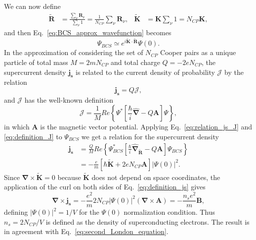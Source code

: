\documentclass[../main/main.tex]{subfiles}
\begin{document}
We can now define
\begin{align}  \label{eq:tildaR_tildaK}
\boldsymbol{\tilde{R}} &= \frac{\sum_{\nu} \boldsymbol{R}_{\nu}}{\sum_{\nu} 1} = \frac{1}{N_{CP}}\sum_{\nu} \boldsymbol{R}_{\nu}, & \boldsymbol{\tilde{K}} &= \boldsymbol{K} \sum_{\nu} 1 = N_{CP} \boldsymbol{K},
\end{align}
and then Eq.~\eqref{eq:BCS_approx_wavefunction} becomes
\begin{equation} \label{eq:BCS_approx2_wavefunction}
    \Psi_{BCS} \simeq e^{i \boldsymbol{\tilde{K}} \cdot \boldsymbol{\tilde{R}}} \Psi(0).
\end{equation}
In the approximation of considering the set of $N_{CP}$ Cooper pairs as a unique particle of total mass $M=2m N_{CP}$ and total charge $Q=-2e N_{CP}$, the supercurrent density $\boldsymbol{j_s}$ is related to the current density of probability $\boldsymbol{\mathcal{J}}$ by the relation
\begin{equation} \label{eq:relation_js_J}
    \boldsymbol{j_s} = Q \boldsymbol{\mathcal{J}},
\end{equation}
and $\boldsymbol{\mathcal{J}}$ has the well-known definition \cite[p.~314]{ballentine1998quantum}
\begin{equation} \label{eq:definition_J}
    \boldsymbol{\mathcal{J}} = \frac{1}{M} Re\left\{ \Psi^{*} \left[ \frac{\hbar}{i}\hat{\boldsymbol{\nabla}} - Q \boldsymbol{A} \right] \Psi \right\},
\end{equation}
in which $\boldsymbol{A}$ is the magnetic vector potential. Applying Eq.~\eqref{eq:relation_js_J} and \eqref{eq:definition_J} to $\Psi_{BCS}$ we get a relation for the supercurrent density
\begin{equation} \label{eq:definition_js}
\begin{split}
    \boldsymbol{j_s} & = \frac{Q}{M} Re\left\{ \Psi_{BCS}^{*} \left[ \frac{\hbar}{i} \hat{\boldsymbol{\nabla}}_{\boldsymbol{\tilde{R}}} - Q \boldsymbol{A} \right] \Psi_{BCS} \right\}\\
    & = -\frac{e}{m} \left[ \hbar \boldsymbol{\tilde{K}} + 2e N_{CP} \boldsymbol{A} \right] |\Psi(0)|^2 .
\end{split}
\end{equation}
Since $\boldsymbol{\nabla} \times \boldsymbol{\tilde{K}} = 0$ because $\boldsymbol{\tilde{K}}$ does not depend on space coordinates, the application of the curl on both sides of Eq.~\eqref{eq:definition_js} gives
\begin{equation} \label{eq:demonstration_second_London_equation}
    \boldsymbol{\nabla}  \times \boldsymbol{j_s} = - \frac{e^2}{m} 2N_{CP}|\Psi(0)|^2 \left( \boldsymbol{\nabla}  \times \boldsymbol{A} \right) = -\frac{n_s e^2}{m} \boldsymbol{B},
\end{equation}
defining $|\Psi(0)|^2 = 1/V$ for the $\Psi(0)$ normalization condition. Thus $n_s = 2N_{CP}/V$ is defined as the density of superconducting electrons. The result is in agreement with Eq.~\eqref{eq:second_London_equation}.\\
\end{document}

